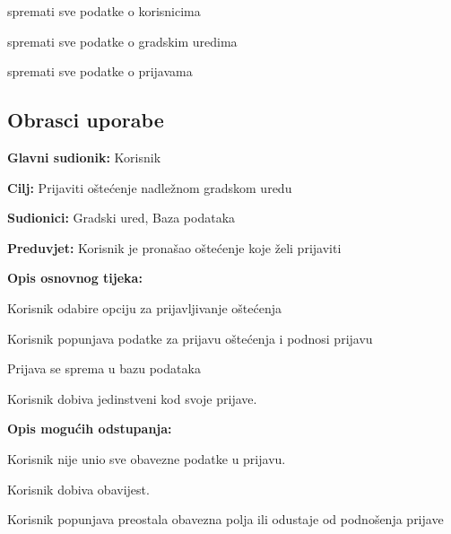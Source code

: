 \begin{packed_enum}
				\item  {}
				\begin{packed_enum}
					\item spremati sve podatke o korisnicima
					\item spremati sve podatke o gradskim uredima
					\item spremati sve podatke o prijavama
				\end{packed_enum}
				
			\end{packed_enum}
						
			\eject 
			
			\subsection{Obrasci uporabe}

					\noindent {}
					\begin{packed_item}
	
						\item \textbf{Glavni sudionik:} Korisnik
						\item  \textbf{Cilj:} Prijaviti oštećenje nadležnom gradskom uredu
						\item  \textbf{Sudionici:} Gradski ured, Baza podataka
						\item  \textbf{Preduvjet:} Korisnik je pronašao oštećenje koje želi prijaviti
						
						\item  \textbf{Opis osnovnog tijeka:}
						\item[] \begin{packed_enum}
							\item Korisnik odabire opciju za prijavljivanje oštećenja
							\item Korisnik popunjava podatke za prijavu oštećenja i podnosi prijavu
							\item Prijava se sprema u bazu podataka
							\item Korisnik dobiva jedinstveni kod svoje prijave.
						\end{packed_enum}
						
						\item  \textbf{Opis mogućih odstupanja:}
						\item[] \begin{packed_item}
							\item[2.a] Korisnik nije unio sve obavezne podatke u prijavu.
							\item[] \begin{packed_enum}
								\item Korisnik dobiva obavijest.
								\item Korisnik popunjava preostala obavezna polja ili odustaje od podnošenja prijave
							\end{packed_enum}
							
						\end{packed_item}
					\end{packed_item}
					
